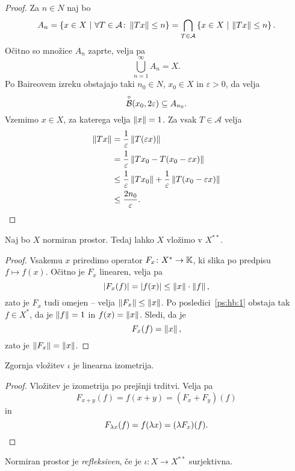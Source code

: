 \begin{proof}
Za $n \in N$ naj bo
\[
A_n = 
\left\{x \in X~\middle\vert~\forall T \in \mathcal{A} \colon \left\lVert Tx\right\rVert \leq n\right\} =
\bigcap_{T \in \mathcal{A}} \left\{x \in X~\middle\vert~\left\lVert Tx\right\rVert \leq n\right\}.
\]
Očitno so množice $A_n$ zaprte, velja pa
\[
\bigcup_{n=1}^\infty A_n = X.
\]
Po Baireovem izreku obstajajo taki $n_0 \in N$, $x_0 \in X$ in
$\varepsilon > 0$, da velja
\[
\overset{\circ}{\mathcal{B}}(x_0, 2\varepsilon) \subseteq A_{n_0}.
\]
Vzemimo $x \in X$, za katerega velja $\left\lVert x\right\rVert = 1$. Za vsak
$T \in \mathcal{A}$ velja
\begin{align*}
\left\lVert Tx\right\rVert &= \frac{1}{\varepsilon} \left\lVert T(\varepsilon x)\right\rVert
\\
&= \frac{1}{\varepsilon} \left\lVert Tx_0 - T(x_0 - \varepsilon x)\right\rVert
\\
&\leq \frac{1}{\varepsilon} \left\lVert Tx_0\right\rVert +
\frac{1}{\varepsilon} \left\lVert T(x_0 - \varepsilon x)\right\rVert
\\
&\leq \frac{2n_0}{\varepsilon}. \qedhere
\end{align*}
\end{proof}

\begin{trditev}
Naj bo $X$ normiran prostor. Tedaj lahko $X$ vložimo v $X^{**}$.
\end{trditev}

\begin{proof}
Vsakemu $x$ priredimo operator $F_x \colon X^* \to \mathbb{K}$, ki slika po
predpisu $f \mapsto f(x)$. Očitno je $F_x$ linearen, velja pa
\[
\left\lvert F_x(f)\right\rvert = \left\lvert f(x)\right\rvert \leq \left\lVert x\right\rVert \cdot \left\lVert f\right\rVert,
\]
zato je $F_x$ tudi omejen -- velja $\left\lVert F_x\right\rVert \leq \left\lVert x\right\rVert$. Po
posledici~\ref{ps:hb:1} obstaja tak $f \in X^*$, da je $\left\lVert f\right\rVert=1$
in $f(x) = \left\lVert x\right\rVert$. Sledi, da je
\[
F_x(f) = \left\lVert x\right\rVert,
\]
zato je $\left\lVert F_x\right\rVert = \left\lVert x\right\rVert$.
\end{proof}

\begin{trditev}
Zgornja vložitev $\iota$ je linearna izometrija.
\end{trditev}

\begin{proof}
Vložitev je izometrija po prejšnji trditvi. Velja pa
\[
F_{x+y}(f) = f(x+y) = (F_x + F_y)(f)
\]
in
\[
F_{\lambda x}(f) = f(\lambda x) = (\lambda F_x)(f). \qedhere
\]
\end{proof}

\begin{definicija}
Normiran prostor je
\emph{refleksiven}, če je
$\iota \colon X \to X^{**}$ surjektivna.
\end{definicija}

